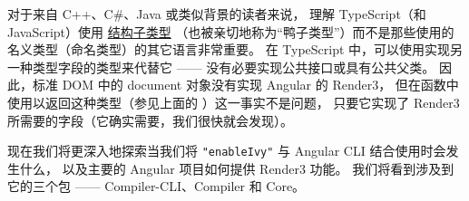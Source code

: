 
对于来自 C++、C\#、Java 或类似背景的读者来说，
理解 TypeScript（和 JavaScript）使用
\href{https://www.typescriptlang.org/docs/handbook/interfaces.html}{结构子类型}
（也被亲切地称为“鸭子类型”）而不是那些使用的名义类型（命名类型）的其它语言非常重要。
在 TypeScript 中，可以使用实现另一种类型字段的类型来代替它 —— 没有必要实现公共接口或具有公共父类。
因此，标准 DOM 中的 document 对象没有实现 Angular 的 Render3，
但在函数中使用以返回这种类型（参见上面的 ）这一事实不是问题，
只要它实现了 Render3 所需要的字段（它确实需要，我们很快就会发现）。


现在我们将更深入地探索当我们将 \texttt{"enableIvy"} 与 Angular CLI 结合使用时会发生什么，
以及主要的 Angular 项目如何提供 Render3 功能。
我们将看到涉及到它的三个包 —— Compiler-CLI、Compiler 和 Core。


